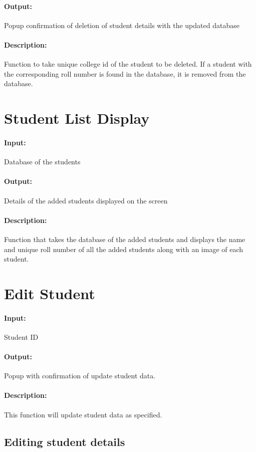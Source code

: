 \paragraph{Output:}
Popup confirmation of deletion of student details with the updated database
\paragraph{Description:}
Function to take unique college id of the student to be deleted. If a
student with the corresponding roll number is found in the database, 
it is removed from the database.


\section{Student List Display}
\paragraph{Input:}
Database of the students
\paragraph{Output:}
Details of the added students displayed on the screen
\paragraph{Description:}
Function that takes the database of the added students and displays the name
and unique roll number of all the added students along with an image of each
student.


\section{Edit Student}
\paragraph{Input:}
Student ID
\paragraph{Output:}
Popup with confirmation of update student data.
\paragraph{Description:} This function will update student data as specified.

\subsection{Editing student details}
